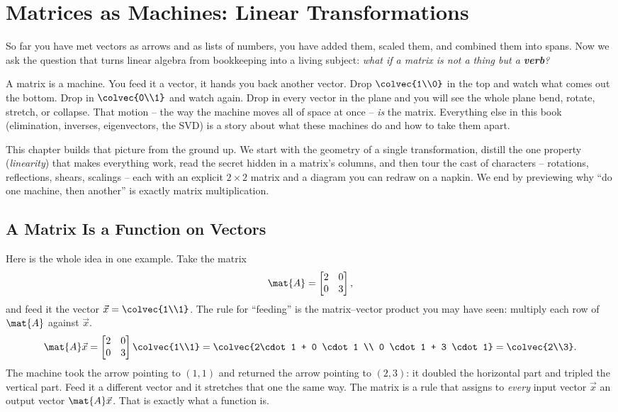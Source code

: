 \chapter{Matrices as Machines: Linear Transformations}

So far you have met vectors as arrows and as lists of numbers, you have added
them, scaled them, and combined them into spans. Now we ask the question that
turns linear algebra from bookkeeping into a living subject: \emph{what if a
matrix is not a thing but a \textbf{verb}?}

A matrix is a machine. You feed it a vector, it hands you back another vector.
Drop $\colvec{1\\0}$ in the top and watch what comes out the bottom. Drop in
$\colvec{0\\1}$ and watch again. Drop in every vector in the plane and you will
see the whole plane bend, rotate, stretch, or collapse. That motion -- the way
the machine moves all of space at once -- \emph{is} the matrix. Everything else
in this book (elimination, inverses, eigenvectors, the SVD) is a story about
what these machines do and how to take them apart.

This chapter builds that picture from the ground up. We start with the geometry
of a single transformation, distill the one property (\emph{linearity}) that
makes everything work, read the secret hidden in a matrix's columns, and then
tour the cast of characters -- rotations, reflections, shears, scalings -- each
with an explicit $2\times 2$ matrix and a diagram you can redraw on a napkin. We
end by previewing why ``do one machine, then another'' is exactly matrix
multiplication.

\section{A Matrix Is a Function on Vectors}
\label{ch05:matrix-is-function}

Here is the whole idea in one example. Take the matrix
\[
  \mat{A} = \begin{bmatrix} 2 & 0 \\ 0 & 3 \end{bmatrix},
\]
and feed it the vector $\vec{x} = \colvec{1\\1}$. The rule for ``feeding'' is the
matrix--vector product you may have seen: multiply each row of $\mat{A}$ against
$\vec{x}$.
\[
  \mat{A}\vec{x}
  = \begin{bmatrix} 2 & 0 \\ 0 & 3 \end{bmatrix}\colvec{1\\1}
  = \colvec{2\cdot 1 + 0 \cdot 1 \\ 0 \cdot 1 + 3 \cdot 1}
  = \colvec{2\\3}.
\]
The machine took the arrow pointing to $(1,1)$ and returned the arrow pointing to
$(2,3)$: it doubled the horizontal part and tripled the vertical part. Feed it a
different vector and it stretches that one the same way. The matrix is a rule
that assigns to \emph{every} input vector $\vec{x}$ an output vector
$\mat{A}\vec{x}$. That is exactly what a function is.

